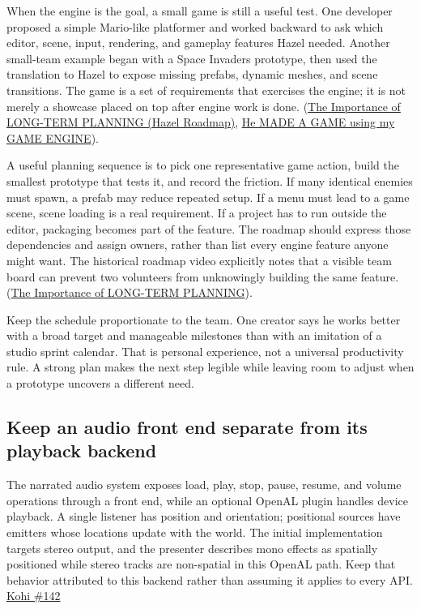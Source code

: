When the engine is the goal, a small game is still a useful test. One developer proposed a simple Mario-like platformer and worked backward to ask which editor, scene, input, rendering, and gameplay features Hazel needed. Another small-team example began with a Space Invaders prototype, then used the translation to Hazel to expose missing prefabs, dynamic meshes, and scene transitions. The game is a set of requirements that exercises the engine; it is not merely a showcase placed on top after engine work is done. (\href{https://www.youtube.com/watch?v=OsnwKYxPX1A&t=5m29s}{The Importance of LONG-TERM PLANNING (Hazel Roadmap)}, \href{https://www.youtube.com/watch?v=56ISmbJE9S4&t=2m10s}{He MADE A GAME using my GAME ENGINE}).

A useful planning sequence is to pick one representative game action, build the smallest prototype that tests it, and record the friction. If many identical enemies must spawn, a prefab may reduce repeated setup. If a menu must lead to a game scene, scene loading is a real requirement. If a project has to run outside the editor, packaging becomes part of the feature. The roadmap should express those dependencies and assign owners, rather than list every engine feature anyone might want. The historical roadmap video explicitly notes that a visible team board can prevent two volunteers from unknowingly building the same feature. (\href{https://www.youtube.com/watch?v=OsnwKYxPX1A&t=6m35s}{The Importance of LONG-TERM PLANNING}).

Keep the schedule proportionate to the team. One creator says he works better with a broad target and manageable milestones than with an imitation of a studio sprint calendar. That is personal experience, not a universal productivity rule. A strong plan makes the next step legible while leaving room to adjust when a prototype uncovers a different need.

\subsection{Keep an audio front end separate from its playback backend}\label{05-engine-i-ch009-keep-an-audio-front-end-separate-from-its-playback-backend}

The narrated audio system exposes load, play, stop, pause, resume, and volume operations through a front end, while an optional OpenAL plugin handles device playback. A single listener has position and orientation; positional sources have emitters whose locations update with the world. The initial implementation targets stereo output, and the presenter describes mono effects as spatially positioned while stereo tracks are non-spatial in this OpenAL path. Keep that behavior attributed to this backend rather than assuming it applies to every API. \href{https://www.youtube.com/watch?v=xb23Y9o7tP4}{Kohi \#142}

